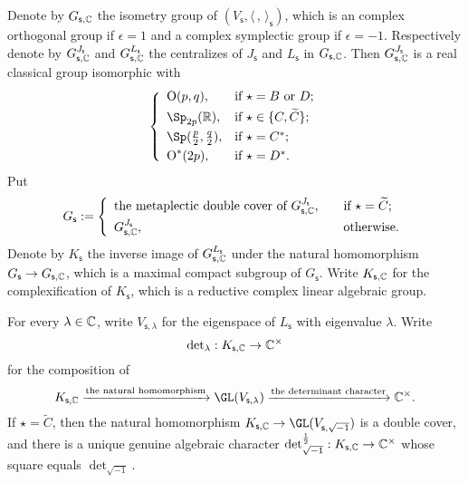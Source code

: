 \documentclass[12pt,a4paper]{amsart}
\newcommand{\oO}{\operatorname{O}}
\newcommand{\R}{\mathbb R}
\newcommand{\la}{\langle}
\newcommand{\ra}{\rangle}
\newcommand{\be}{\begin {equation}}
\newcommand{\ee}{\end {equation}}
\numberwithin{equation}{section}
\theoremstyle{remark}
\begin{document}
Denote by $G_{\mathsf s, \mathbb{C}}$ the isometry group of $ (V_{\mathsf s}, \la\,,\,\ra_{\mathsf s})$, which is an complex orthogonal group if $\epsilon=1$ and a complex symplectic group if $\epsilon=-1$. Respectively denote by  $G_{\mathsf s, \mathbb{C}}^{J_\mathsf s}$  and  $G_{\mathsf s, \mathbb{C}}^{L_\mathsf s}$ the centralizes of $J_\mathsf s$ and $L_\mathsf s$ in  $G_{\mathsf s, \mathbb{C}}$. Then $G_{\mathsf s, \mathbb{C}}^{J_\mathsf s}$ is a real classical group isomorphic with
\[
 \left\{
     \begin{array}{ll}
         \oO(p, q), &\hbox{if $\star=B$ or $D$}; \smallskip\\
            \Sp_{2p}(\R), &\hbox{if $\star\in \{C,\widetilde C\}$}; \smallskip\\
                   \Sp(\frac{p}{2}, \frac{q}{2}), &\hbox{if $\star=C^*$}; \smallskip \\
          \oO^*(2p), &\hbox{if $\star=D^*$}.\\
            \end{array}
   \right.
\]
Put
\[
G_\mathsf s:= \left\{
     \begin{array}{ll}
       \textrm{the metaplectic double cover of $G_{\mathsf s, \C}^{J_\mathsf s}$}, \quad &\hbox{if $\star=\widetilde C$}; \smallskip\\
            G_{\mathsf s, \C}^{J_\mathsf s},  \quad  &\hbox{otherwise}.\\
            \end{array}
   \right.
\]
Denote by $K_{\mathsf s}$ the inverse image of  $G_{\mathsf s, \mathbb{C}}^{L_\mathsf s}$  under the natural homomorphism $G_\mathsf s\rightarrow G_{\mathsf s,\mathbb{C}}$, which is a maximal compact subgroup of $G_{\mathsf s}$. Write $K_{\mathsf s, \mathbb{C}}$ for the complexification of  $K_{\mathsf s}$, which is a reductive complex linear algebraic group.

For every $\lambda\in \mathbb{C}$, write $V_{\mathsf s, \lambda}$ for the eigenspace of $L_{\mathsf s}$ with eigenvalue $\lambda$. Write
\[
{\det}_\lambda : K_{\mathsf s, \mathbb{C}}\rightarrow \mathbb{C}^\times
\]
for the composition of
\be\label{comdet}
   K_{\mathsf s, \C}\xrightarrow{\textrm{the natural homomorphism}} \GL(V_{\mathsf s, \lambda})\xrightarrow{\textrm{the determinant character}}\C^\times.
\ee
If $\star=\widetilde C$, then the natural homomorphism  $ K_{\mathsf s, \C}\rightarrow \GL(V_{\mathsf s, \sqrt{-1}})$ is a double cover, and there is a unique genuine algebraic character
$\det_{\sqrt{-1}}^{\frac{1}{2}}:  K_{\mathsf s, \mathbb{C}}\rightarrow \mathbb{C}^\times $ whose square equals $\det_{\sqrt{-1}}$.
\end{document}
